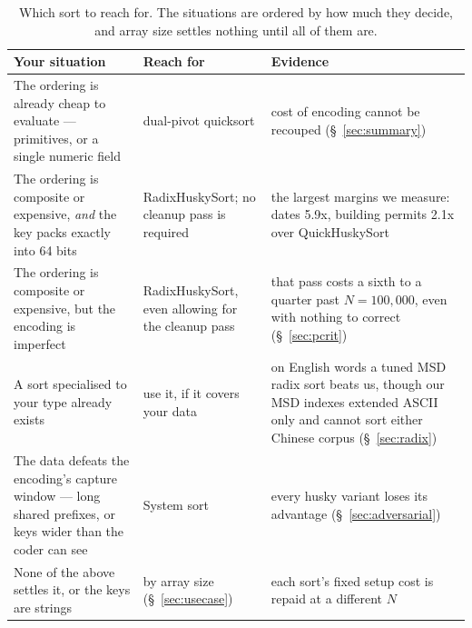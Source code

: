 \documentclass[twoside,leqno,twocolumn]{article}
\begin{document}
\begin{table}
  \caption{Which sort to reach for. The situations are ordered by how much they decide, and
    array size settles nothing until all of them are.}
  \label{tab:Guidance}
  \begin{tabular}{p{}p{}p{}}
    \toprule
Your situation & Reach for & Evidence \\
    \midrule
    The ordering is already cheap to evaluate --- primitives, or a single numeric field
      & dual-pivot quicksort & cost of encoding cannot be recouped (\S~\ref{sec:summary}) \\
    The ordering is composite or expensive, \emph{and} the key packs exactly into 64 bits
      & RadixHuskySort; no cleanup pass is required
      & the largest margins we measure: dates 5.9x, building permits 2.1x over QuickHuskySort \\
    The ordering is composite or expensive, but the encoding is imperfect
      & RadixHuskySort, even allowing for the cleanup pass
      & that pass costs a sixth to a quarter past $N=100{,}000$, even with nothing to correct
        (\S~\ref{sec:pcrit}) \\
    A sort specialised to your type already exists
      & use it, if it covers your data
      & on English words a tuned MSD radix sort beats us, though our MSD indexes extended
        ASCII only and cannot sort either Chinese corpus (\S~\ref{sec:radix}) \\
    The data defeats the encoding's capture window --- long shared prefixes, or keys wider than
    the coder can see
      & System sort & every husky variant loses its advantage (\S~\ref{sec:adversarial}) \\
    None of the above settles it, or the keys are strings
      & by array size (\S~\ref{sec:usecase})
      & each sort's fixed setup cost is repaid at a different $N$ \\
    \bottomrule
  \end{tabular}
\end{table}
\end{document}
